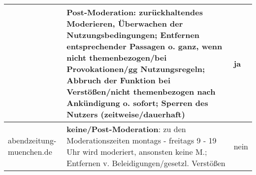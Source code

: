 \begin{longtable}{p{24mm}p{98mm}p{11mm}}
& {\bfseries Post-Moderation}: zurückhaltendes Moderieren, Überwachen der
  Nutzungsbedingungen; Entfernen entsprechender Passagen o. ganz, wenn nicht
  themenbezogen/bei Provokationen/gg Nutzungsregeln; Abbruch der
  Funktion bei Verstößen/nicht themenbezogen nach Ankündigung o. sofort;
  Sperren  des Nutzers (zeitweise/dauerhaft)
  & \centerline{ja}
\\\midrule

abendzeitung-muenchen.de

& {\bfseries keine/Post-Moderation}: zu den Moderationszeiten montags - freitags 9 - 19 Uhr
wird moderiert, ansonsten keine M.; Entfernen v. Beleidigungen/gesetzl. Verstößen
  & \centerline{nein}


\end{longtable}

\endgroup


